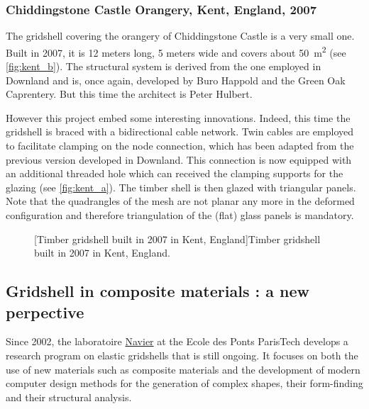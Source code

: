 \subsubsection{Chiddingstone Castle Orangery, Kent, England, 2007}
The gridshell covering the orangery of Chiddingstone Castle is a very small one. Built in 2007, it is 12 meters long, 5 meters wide and covers about \SI{50}{m^2} (see \cref{fig:kent_b}). The structural system is derived from the one employed in Downland and is, once again, developed by Buro Happold and the Green Oak Caprentery. But this time the architect is Peter Hulbert.

However this project embed some interesting innovations. Indeed, this time the gridshell is braced with a bidirectional cable network. Twin cables are employed to facilitate clamping on the node connection, which has been adapted from the previous version developed in Downland. This connection is now equipped with an additional threaded hole which can received the clamping supports for the glazing (see \cref{fig:kent_a}). The timber shell is then glazed with triangular panels. Note that the quadrangles of the mesh are not planar any more in the deformed configuration and therefore triangulation of the (flat) glass panels is mandatory.

\begin{figure}[t]
     	\centering
		\hspace*{\fill}
		\vspace{10pt}
		[Timber gridshell built in 2007 in Kent, England]{Timber gridshell built in 2007 in Kent, England.}
		\label{fig:kent} 
\end{figure}

\subsection{Gridshell in composite materials : a new perpective}
Since 2002, the laboratoire \href{http://navier.enpc.fr}{Navier} at the Ecole des Ponts ParisTech develops a research program on elastic gridshells that is still ongoing. It focuses on both the use of new materials such as composite materials and the development of modern computer design methods for the generation of complex shapes, their form-finding and their structural analysis.

